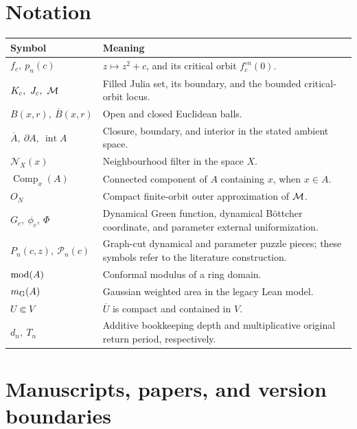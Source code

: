 \section*{Notation}

\begin{center}\small
\begin{tabularx}{\textwidth}{@{}P{0.28\textwidth}Y@{}}
\textbf{Symbol} & \textbf{Meaning}\\
\hline
$f_c,\ p_n(c)$ & $z\mapsto z^2+c$, and its critical orbit
$f_c^{\circ n}(0)$.\\
$K_c,\ J_c,\ \mathcal M$ & Filled Julia set, its boundary, and the bounded
critical-orbit locus.\\
$B(x,r),\ \overline B(x,r)$ & Open and closed Euclidean balls.\\
$\overline A,\ \partial A,\ \operatorname{int}A$ &
Closure, boundary, and interior in the stated ambient space.\\
$\mathcal N_X(x)$ & Neighbourhood filter in the space $X$.\\
$\operatorname{Comp}_x(A)$ & Connected component of $A$ containing $x$,
when $x\in A$.\\
$O_N$ & Compact finite-orbit outer approximation of $\mathcal M$.\\
$G_c,\ \phi_c,\ \Phi$ & Dynamical Green function, dynamical Böttcher
coordinate, and parameter external uniformization.\\
$P_n(c,z),\ \mathcal P_n(c)$ & Graph-cut dynamical and parameter puzzle
pieces; these symbols refer to the literature construction.\\
$\operatorname{mod}(A)$ & Conformal modulus of a ring domain.\\
$m_{\mathrm G}(A)$ & Gaussian weighted area in the legacy Lean model.\\
$U\Subset V$ & $\overline U$ is compact and contained in $V$.\\
$d_n,\ T_n$ & Additive bookkeeping depth and multiplicative original
return period, respectively.\\
\end{tabularx}
\end{center}

\section*{Manuscripts, papers, and version boundaries}

